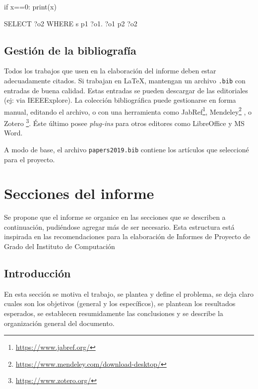 \documentclass[conference]{IEEEtran}
\begin{document}
\begin{sflisting}[style=python, caption= Ejemplo de código Python,label=codigo1]
	if x==0:
	print(x)
	
\end{sflisting}

\begin{sflisting}[style=sparql,caption= Ejemplo de consulta SPARQL,label=codigo2]
	SELECT ?o2
	WHERE { s p1 ?o1.
		?o1 p2 ?o2
	}
\end{sflisting}


\subsection{Gestión de la bibliografía}

Todos los trabajos que usen en la elaboración del informe deben estar adecuadamente citados. Si trabajan en \LaTeX, mantengan un archivo \texttt{.bib} con entradas de buena calidad. Estas entradas se pueden descargar de las editoriales (ej: via IEEEExplore). La colección bibliográfica puede gestionarse en forma manual, editando el archivo, o con una herramienta como JabRef\footnote{\url{https://www.jabref.org/}}, Mendeley\footnote{\url{https://www.mendeley.com/download-desktop/}} , o Zotero \footnote{\url{https://www.zotero.org/}}. Éste último posee \textit{plug-ins} para otros editores como LibreOffice y MS Word.

A modo de base, el archivo \texttt{papers2019.bib} contiene los artículos que seleccioné para el proyecto.


\section{Secciones del informe}
\label{secciones}

Se propone que el informe se organice en las secciones que se describen a continuación, pudiéndose agregar más de ser necesario. Esta estructura está inspirada en las recomendaciones para la elaboración de Informes de Proyecto de Grado del Instituto de Computación \cite{Proygrado} 


\subsection{Introducción}
\label{intro}

En esta sección se motiva el trabajo, se plantea y define el problema, se deja claro   cuales   son   los   objetivos   (general y los   específicos),  se  plantean  los resultados esperados, se establecen resumidamente las conclusiones y se describe la organización general del documento.
\end{document}
